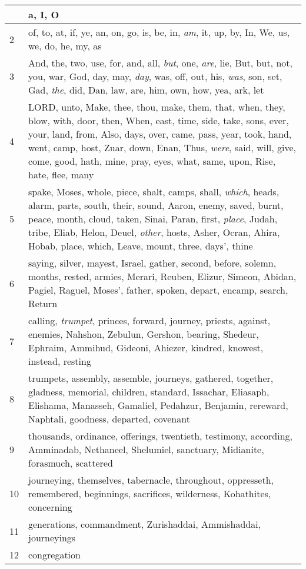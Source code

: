 \begin{longtable}{l|p{3.75in}}
\hline \hline
\endlastfoot
1 & a, I, O \\ \hline
2 & of, to, at, if, ye, an, on, go, is, be, in, \emph{am}, it, up, by, In, We, us, we, do, he, my, as \\ \hline
3 & And, the, two, use, for, and, all, \emph{but}, one, \emph{are}, lie, But, but, not, you, war, God, day, may, \emph{day}, was, off, out, his, \emph{was}, son, set, Gad, \emph{the}, did, Dan, law, are, him, own, how, yea, ark, let \\ \hline
4 & LORD, unto, Make, thee, thou, make, them, that, when, they, blow, with, door, then, When, east, time, side, take, sons, ever, your, land, from, Also, days, over, came, pass, year, took, hand, went, camp, host, Zuar, down, Enan, Thus, \emph{were}, said, will, give, come, good, hath, mine, pray, eyes, what, same, upon, Rise, hate, flee, many \\ \hline
5 & spake, Moses, whole, piece, shalt, camps, shall, \emph{which}, heads, alarm, parts, south, their, sound, Aaron, enemy, saved, burnt, peace, month, cloud, taken, Sinai, Paran, first, \emph{place}, Judah, tribe, Eliab, Helon, Deuel, \emph{other}, hosts, Asher, Ocran, Ahira, Hobab, place, which, Leave, mount, three, days', thine \\ \hline
6 & saying, silver, mayest, Israel, gather, second, before, solemn, months, rested, armies, Merari, Reuben, Elizur, Simeon, Abidan, Pagiel, Raguel, Moses', father, spoken, depart, encamp, search, Return \\ \hline
7 & calling, \emph{trumpet}, princes, forward, journey, priests, against, enemies, Nahshon, Zebulun, Gershon, bearing, Shedeur, Ephraim, Ammihud, Gideoni, Ahiezer, kindred, knowest, instead, resting \\ \hline
8 & trumpets, assembly, assemble, journeys, gathered, together, gladness, memorial, children, standard, Issachar, Eliasaph, Elishama, Manasseh, Gamaliel, Pedahzur, Benjamin, rereward, Naphtali, goodness, departed, covenant \\ \hline
9 & thousands, ordinance, offerings, twentieth, testimony, according, Amminadab, Nethaneel, Shelumiel, sanctuary, Midianite, forasmuch, scattered \\ \hline
10 & journeying, themselves, tabernacle, throughout, oppresseth, remembered, beginnings, sacrifices, wilderness, Kohathites, concerning \\ \hline
11 & generations, commandment, Zurishaddai, Ammishaddai, journeyings \\ \hline
12 & congregation \\ \hline
\end{longtable}






